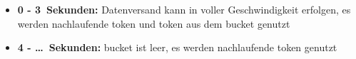 \begin{itemize}
  \item\textbf{0 - 3~Sekunden:} Datenversand kann in voller Geschwindigkeit erfolgen, es werden nachlaufende token und token aus dem bucket genutzt
  \item\textbf{4 - \dots~Sekunden:} bucket ist leer, es werden nachlaufende token genutzt
\end{itemize}




%






